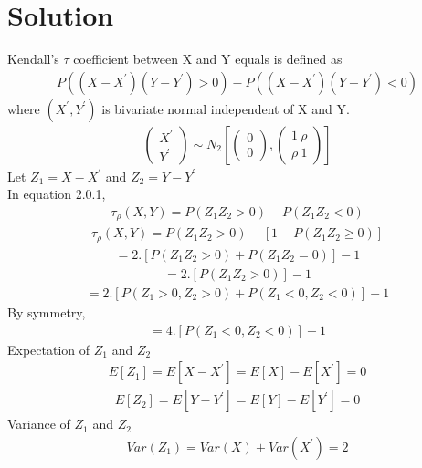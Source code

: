 \documentclass[journal,12pt,twocolumn]{IEEEtran}
\begin{document}
\section{Solution}
Kendall's $\tau$ coefficient between X and Y equals is defined as 
\begin{align}
    P((X-X^\prime)(Y-Y^\prime)>0)-P((X-X^\prime)(Y-Y^\prime)<0)
\end{align}
where $(X^\prime, Y^\prime)$ is bivariate normal independent of X and Y.
\begin{align}
    \begin{pmatrix}X^\prime\\Y^\prime\end{pmatrix} \sim N_{2} \left[\begin{pmatrix}0\\0\end{pmatrix},\begin{pmatrix}1\ \rho\\ \rho\ 1\end{pmatrix} \right]
\end{align}
Let $Z_{1}= X-X^\prime$ and $Z_{2}= Y-Y^\prime$\\
In equation 2.0.1,
\begin{align}
    \tau_{\rho}(X,Y)= P(Z_{1}Z_{2}>0)-P(Z_{1}Z_{2}<0)
\end{align}
\begin{align}
    \tau_{\rho}(X,Y)= P(Z_{1}Z_{2}>0)-[1-P(Z_{1}Z_{2}\geq0)]
\end{align}
\begin{align}
    = 2.[P(Z_{1}Z_{2}>0)+P(Z_{1}Z_{2}=0)]-1
\end{align}
\begin{align}
    = 2.[P(Z_{1}Z_{2}>0)]-1
\end{align}
\begin{align}
    = 2.[P(Z_{1}>0,Z_{2}>0)+P(Z_{1}<0,Z_{2}<0)]-1
\end{align}
By symmetry,
\begin{align}
    = 4.[P(Z_{1}<0,Z_{2}<0)]-1
\end{align}
Expectation of $Z_{1}$ and $Z_{2}$
\begin{align}
   E[Z_{1}] = E[X-X^\prime] = E[X]-E[X^\prime] = 0
\end{align}
\begin{align}
   E[Z_{2}] = E[Y-Y^\prime] = E[Y]-E[Y^\prime] = 0
\end{align}
Variance of $Z_{1}$ and $Z_{2}$
\begin{align}
   Var(Z_{1}) = Var(X)+Var(X^\prime) = 2
\end{align}
\end{document}
